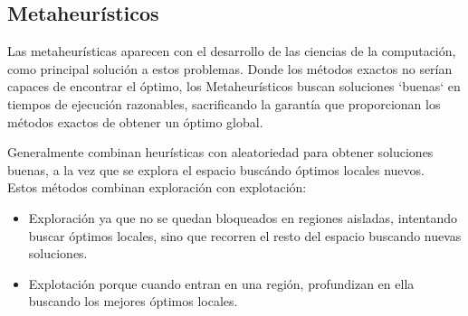 \documentclass[12pt,a4paper]{book}
\begin{document}
\subsection{Metaheurísticos}
Las metaheurísticas aparecen con el desarrollo de las ciencias de la computación, como principal solución a estos problemas. Donde los métodos exactos no serían capaces de encontrar el óptimo,
los Metaheurísticos buscan soluciones `buenas` en tiempos de ejecución razonables, sacrificando la garantía que proporcionan los métodos exactos de obtener un óptimo global.

Generalmente combinan heurísticas con aleatoriedad para obtener soluciones buenas, a la vez que se explora el espacio buscándo óptimos locales nuevos.\\
Estos métodos combinan exploración con explotación:
\begin{itemize}
    \item Exploración ya que no se quedan bloqueados en regiones aisladas, intentando buscar óptimos locales, sino que recorren el resto del espacio buscando nuevas soluciones.
    \item Explotación porque cuando entran en una región, profundizan en ella buscando los mejores óptimos locales.
\end{itemize}
\end{document}
